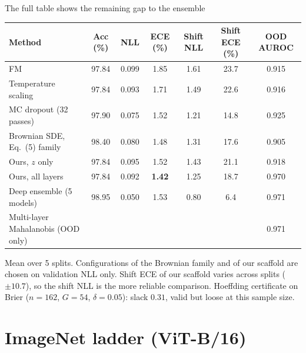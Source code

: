 \documentclass[aspectratio=169,11pt]{beamer}
\begin{document}
\begin{frame}{The full table shows the remaining gap to the ensemble}
  \footnotesize
  \centering
  \begin{tabular}{@{}lcccccc@{}}
    \toprule
    Method & Acc (\%) & NLL & ECE (\%) & Shift NLL & Shift ECE (\%) & OOD AUROC\\
    \midrule
    FM & 97.84 & 0.099 & 1.85 & 1.61 & 23.7 & 0.915\\
    Temperature scaling & 97.84 & 0.093 & 1.71 & 1.49 & 22.6 & 0.916\\
    MC dropout (32 passes) & 97.90 & 0.075 & 1.52 & 1.21 & 14.8 & 0.925\\
    Brownian SDE, Eq.~(5) family & 98.40 & 0.080 & 1.48 & 1.31 & 17.6 & 0.905\\
    \midrule
    Ours, $z$ only & 97.84 & 0.095 & 1.52 & 1.43 & 21.1 & 0.918\\
    Ours, all layers & 97.84 & 0.092 & \textbf{1.42} & 1.25 & 18.7 & 0.970\\
    \midrule
    Deep ensemble (5 models) & 98.95 & 0.050 & 1.53 & 0.80 & 6.4 & 0.971\\
    Multi-layer Mahalanobis (OOD only) & & & & & & 0.971\\
    \bottomrule
  \end{tabular}
  \par\medskip\raggedright
  Mean over 5 splits. Configurations of the Brownian family and of our scaffold are chosen on validation NLL only. Shift ECE of our scaffold varies across splits ($\pm10.7$), so the shift NLL is the more reliable comparison. Hoeffding certificate on Brier ($n=162$, $G=54$, $\delta=0.05$): slack $0.31$, valid but loose at this sample size.
\end{frame}

\section{ImageNet ladder (ViT-B/16)}
\end{document}
